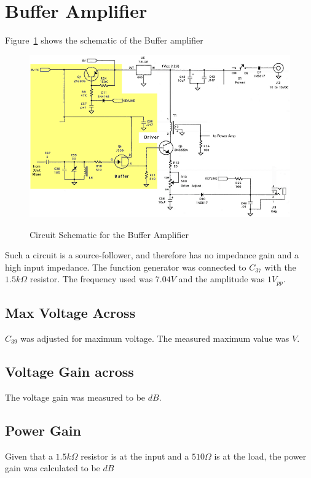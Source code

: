 \section{Buffer Amplifier}

Figure~\ref{BuffAmp} shows the schematic of the Buffer amplifier

\begin{figure}[h!]
  \centering
  \includegraphics[scale=0.5]{./img/BuffAmp.png}
  \label{BuffAmp}
  \caption{Circuit Schematic for the Buffer Amplifier}
\end{figure}

Such a circuit is a source-follower, and therefore has no impedance gain and a
high input impedance. The function generator was connected to $C_{37}$ with
the $1.5k\Omega$ resistor. The frequency used was $7.04V$ and the amplitude
was $1V_{pp}$.

\subsection{Max Voltage Across }
$C_{39}$ was adjusted for maximum voltage. The measured maximum value
was $\boxed{ V}$.

\subsection{Voltage Gain across }
The voltage gain was measured to be $\boxed{ dB}$.

\subsection{Power Gain}
Given that a $1.5k\Omega$ resistor is at the input and a $510\Omega$ is
at the load, the power gain was calculated to be $\boxed{ dB}$
